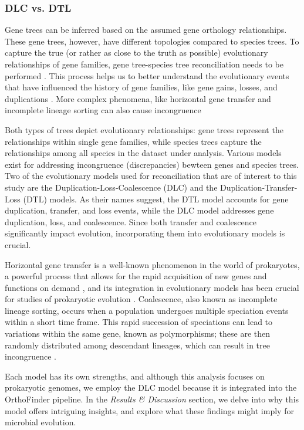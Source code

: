 \subsubsection*{DLC vs. DTL}
Gene trees can be inferred based on the assumed gene orthology relationships. These gene trees, however, have different topologies compared to species trees. To capture the true (or rather as close to the truth as possible) evolutionary relationships of gene families, gene tree-species tree reconciliation needs to be performed \cite{swenson2012}. This process helps us to better understand the evolutionary events that have influenced the history of gene families, like gene gains, losses, and duplications \cite{bansal2012}. More complex phenomena, like horizontal gene transfer and incomplete lineage sorting can also cause incongruence \cite{rasmussen2012} 

Both types of trees depict evolutionary relationships: gene trees represent the relationships within single gene families, while species trees capture the relationships among all species in the dataset under analysis. Various models exist for addressing incongruence (discrepancies) bewteen genes and species trees. Two of the evolutionary models used for reconciliation that are of interest to this study are the Duplication-Loss-Coalescence (DLC) and the Duplication-Transfer-Loss (DTL) models. As their names suggest, the DTL model accounts for gene duplication, transfer, and loss events, while the DLC model addresses gene duplication, loss, and coalescence. Since both transfer and coalescence significantly impact evolution, incorporating them into evolutionary models is crucial.

Horizontal gene transfer is a well-known phenomenon in the world of prokaryotes, a powerful process that allows for the rapid acquisition of new genes and functions on demand \cite{goldenfeld2007, boto2010}, and its integration in evolutionary models has been crucial for studies of prokaryotic evolution \cite{bansal2012}. Coalescence, also known as incomplete lineage sorting, occurs when a population undergoes multiple speciation events within a short time frame. This rapid succession of speciations can lead to variations within the same gene, known as polymorphisms; these are then randomly distributed among descendant lineages, which can result in tree incongruence \cite{rasmussen2012}.

Each model has its own strengths, and although this analysis focuses on prokaryotic genomes, we employ the DLC model because it is integrated into the OrthoFinder pipeline. In the \textit{Results \& Discussion} section, we delve into why this model offers intriguing insights, and explore what these findings might imply for microbial evolution.


